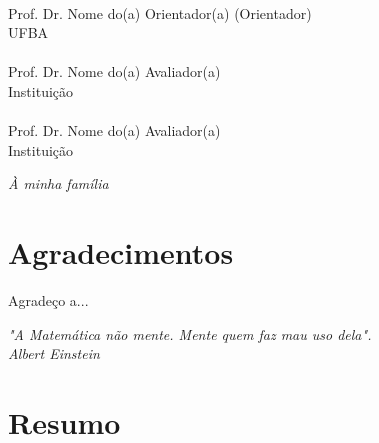 \documentclass[12pt, a4paper]{report}
\begin{document}
\begin{flushright}
\begin{minipage}[l]{12cm}
\begin{center}
\uline{\hspace{10.5cm}} \\
Prof. Dr. Nome do(a) Orientador(a) (Orientador) \\ UFBA \\
\vspace{1cm}
\uline{\hspace{10.5cm}} \\
Prof. Dr. Nome do(a) Avaliador(a) \\ Instituição \\
\vspace{1cm}
\uline{\hspace{10.5cm}} \\
Prof. Dr. Nome do(a) Avaliador(a) \\ Instituição

\end{center}
\end{minipage}
\end{flushright}

\newpage
\vspace*{21cm}
\begin{flushright}
\textit{À minha família}
\end{flushright}


\newpage
\chapter*{Agradecimentos}
\thispagestyle{empty}

Agradeço a...

\newpage
\vspace*{20cm}
\begin{flushright}
\begin{minipage}{7cm}
\begin{flushright}
\textit{
"A Matemática não mente. Mente quem faz mau uso dela". \\
Albert Einstein}
\end{flushright}
\end{minipage}
\end{flushright}


\newpage
\chapter*{Resumo}
\thispagestyle{empty}
\end{document}

